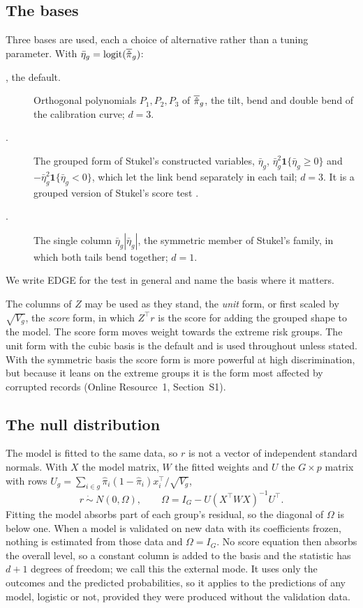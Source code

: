 \subsection{The bases}\label{sec:bases}

Three bases are used, each a choice of alternative rather than a tuning parameter. With
$\bar\eta_g=\operatorname{logit}(\overline{\hat{\pi}}_g)$:
\begin{description}
\item[, the default.] Orthogonal polynomials $P_1,P_2,P_3$ of $\overline{\hat{\pi}}_g$, the tilt, bend and
double bend of the calibration curve; $d=3$.
\item[\DEFstk{}.] The grouped form of Stukel's constructed variables, $\bar\eta_g$,
$\bar\eta_g^2\mathbf 1\{\bar\eta_g\ge0\}$ and $-\bar\eta_g^2\mathbf 1\{\bar\eta_g<0\}$, which let the link
bend separately in each tail; $d=3$. It is a grouped version of Stukel's score test
\citep{stukel1988generalized}.
\item[\DEFsym{}.] The single column $\bar\eta_g|\bar\eta_g|$, the symmetric member of Stukel's
family, in which both tails bend together; $d=1$.
\end{description}
We write EDGE for the test in general and name the basis where it matters.

The columns of $Z$ may be used as they stand, the \emph{unit} form, or first scaled by $\sqrt{V_g}$,
the \emph{score} form, in which $Z^\top r$ is the score for adding the grouped shape to the model. The
score form moves weight towards the extreme risk groups. The unit form with the cubic basis is the
default and is used throughout unless stated. With the symmetric basis the score form is more
powerful at high discrimination, but because it leans on the extreme groups it is the form most
affected by corrupted records (Online Resource~1, Section~S1).

\subsection{The null distribution}\label{sec:null}

The model is fitted to the same data, so $r$ is not a vector of independent standard normals. With
$X$ the model matrix, $W$ the fitted weights and $U$ the $G\times p$ matrix with rows
$U_g=\sum_{i\in g}\hat\pi_i(1-\hat\pi_i)x_i^\top/\sqrt{V_g}$,
\begin{equation}\label{eq:omega}
  r\ \dot\sim\ N(0,\Omega),\qquad \Omega=I_G-U(X^\top WX)^{-1}U^\top .
\end{equation}
Fitting the model absorbs part of each group's residual, so the diagonal of $\Omega$ is below one.
When a model is validated on new data with its coefficients frozen, nothing is estimated from those
data and $\Omega=I_G$. No score equation then absorbs the overall level, so a constant column is added
to the basis and the statistic has $d+1$ degrees of freedom; we call this the external mode. It uses
only the outcomes and the predicted probabilities, so it applies to the predictions of any model,
logistic or not, provided they were produced without the validation data.

